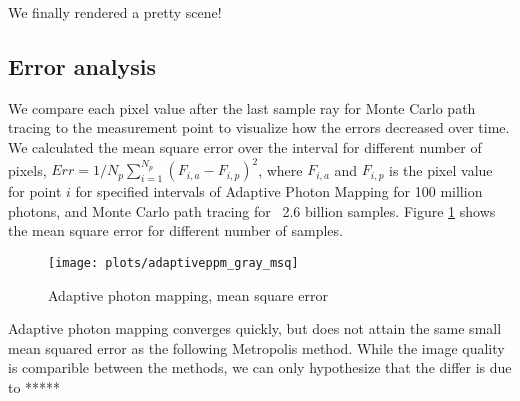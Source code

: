 We finally rendered a pretty scene!

\subsection*{Error analysis}
We compare each pixel value after the last sample ray for Monte Carlo path tracing to the measurement point to visualize how the errors decreased over time. We calculated the mean square error over the interval for different number of pixels, $Err = 1/N_p \sum_{i=1}^{N_p} (F_{i,a} - F_{i,p})^2$, where $F_{i,a}$ and $F_{i,p}$ is the pixel value for point $i$ for specified intervals of Adaptive Photon Mapping for 100 million photons, and Monte Carlo path tracing for ~2.6 billion samples. Figure \ref{fig:adaptive_msq} shows the mean square error for different number of samples.

\begin{figure}[H]
    \centering
    \texttt{[image: plots/adaptiveppm\_gray\_msq]}\\
    \caption{Adaptive photon mapping, mean square error}
    \label{fig:adaptive_msq}
\end{figure}

Adaptive photon mapping converges quickly, but does not attain the same small mean squared error as the following Metropolis method. While the image quality is comparible between the methods, we can only hypothesize that the differ is due to *****




